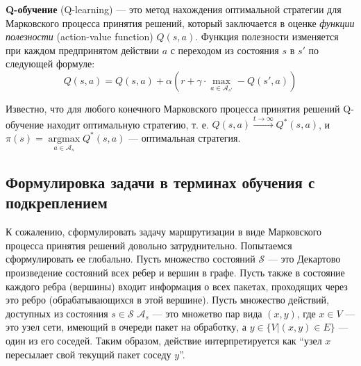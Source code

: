 \documentclass[]{itmo-student-thesis}
\DeclareMathOperator{\argmax}{argmax}
\begin{document}
\textbf{Q-обучение} (Q-learning)\cite{q-learning-orig} --- это метод нахождения
оптимальной стратегии для Марковского процесса принятия решений, который
заключается в оценке \textit{функции полезности} (action-value function)
$Q(s,a)$. Функция полезности изменяется при каждом предпринятом действии $a$ с
переходом из состояния $s$ в $s'$ по следующей формуле:
\[
Q(s, a) = Q(s, a) + \alpha \left( r +
\gamma \cdot \max\limits_{a \in \mathcal{A}_{s'}} - Q(s', a) \right)
\]

Известно, что для любого конечного Марковского процесса принятия решений
Q-обучение находит оптимальную стратегию, т. е. $Q(s, a) \xrightarrow{t
  \rightarrow \infty} Q^*(s, a)$, и $\pi(s) = \argmax\limits_{a \in
  \mathcal{A}_s} {Q^*(s, a)}$ --- оптимальная стратегия.

\subsection{Формулировка задачи в терминах обучения с подкреплением}

К сожалению, сформулировать задачу маршрутизации в виде Марковского процесса
принятия решений довольно затруднительно. Попытаемся сформулировать ее
глобально. Пусть множество состояний $\mathcal{S}$ --- это Декартово произведение
состояний всех ребер и вершин в графе. Пусть также в состояние каждого ребра
(вершины) входит информация о всех пакетах, проходящих через это ребро
(обрабатывающихся в этой вершине). Пусть множество действий, доступных из
состояния $s \in \mathcal{S}$ $\mathcal{A}_s$ --- это множетво пар вида $(x,y)$,
где $x \in V$ --- это узел сети, имеющий в очереди пакет на обработку, а
$y \in \{V | (x, y) \in E\}$ --- один из его соседей. Таким образом, действие
интерпретируется как ``узел $x$ пересылает свой текущий пакет соседу $y$''.
\end{document}
